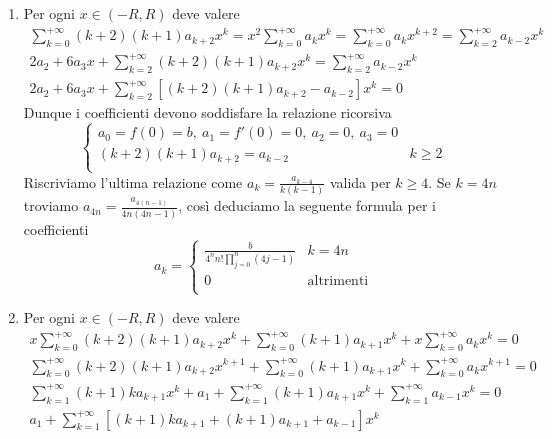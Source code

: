 \documentclass[a4paper]{article}\par \usepackage{style}\par
\begin{document}
\begin{enumerate}[label = (\roman*)]
\item Per ogni $ x \in (-R, R) $ deve valere
  \begin{gather*}
    \sum_{k = 0}^{+\infty} (k + 2)(k + 1) a_{k + 2} x^{k} = x^2 \sum_{k = 0}^{+\infty} a_k x^k = \sum_{k = 0}^{+\infty} a_k x^{k + 2} = \sum_{k = 2}^{+\infty} a_{k - 2} x^k \\
    2 a_2 + 6 a_3 x + \sum_{k = 2}^{+\infty} (k + 2)(k + 1) a_{k + 2} x^{k} = \sum_{k = 2}^{+\infty} a_{k - 2} x^k \\
    2 a_2 + 6 a_3 x + \sum_{k = 2}^{+\infty} \left[(k + 2)(k + 1) a_{k + 2} - a_{k - 2}\right] x^{k} = 0
  \end{gather*}
  Dunque i coefficienti devono soddisfare la relazione ricorsiva
  \begin{equation*}
    \begin{cases}
      a_0 = f(0) = b, \ a_1 = f'(0) = 0, \ a_2 = 0, \ a_3 = 0 \\
      (k + 2) (k + 1) a_{k + 2} = a_{k - 2} & k \geq 2 \\
    \end{cases}
  \end{equation*}
  Riscriviamo l'ultima relazione come $ a_k = \frac{a_{k - 4}}{k (k - 1)} $ valida per $ k \geq 4 $. Se $ k = 4n $ troviamo $ a_{4n} = \frac{a_{4(n - 1)}}{4 n (4n - 1)} $, così deduciamo la seguente formula per i coefficienti
  \begin{equation*}
    a_k =
    \begin{cases}
      \frac{b}{4^{n} n! \prod_{j = 0}^{n} (4j - 1)} & k = 4n \\
      0 & \text{altrimenti} \\
    \end{cases}
  \end{equation*}
\item Per ogni $ x \in (-R, R) $ deve valere
  \begin{gather*}
    x \sum_{k = 0}^{+\infty} (k + 2)(k + 1) a_{k + 2} x^{k} + \sum_{k = 0}^{+\infty} (k + 1) a_{k +1 } x^k + x \sum_{k = 0}^{+\infty} a_k x^k = 0 \\
    \sum_{k = 0}^{+\infty} (k + 2)(k + 1) a_{k + 2} x^{k + 1} + \sum_{k = 0}^{+\infty} (k + 1) a_{k +1 } x^k + \sum_{k = 0}^{+\infty} a_k x^{k + 1} = 0 \\
    \sum_{k = 1}^{+\infty} (k + 1)k a_{k + 1} x^{k} + a_1 + \sum_{k = 1}^{+\infty} (k + 1) a_{k +1 } x^k + \sum_{k = 1}^{+\infty} a_{k - 1} x^{k} = 0 \\
    a_1 + \sum_{k = 1}^{+\infty} \left[(k + 1)k a_{k + 1} + (k + 1) a_{k + 1} + a_{k - 1}\right] x^{k}

\end{gather*}
\end{enumerate}
\end{document}
